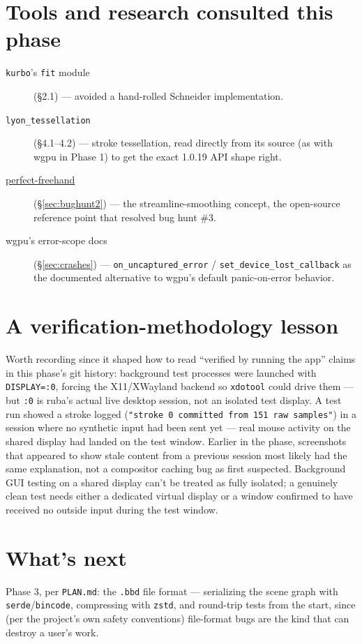 \documentclass[11pt]{article}
\begin{document}
\section{Tools and research consulted this phase}
\begin{description}
  \item[\texttt{kurbo}'s \texttt{fit} module] (\S2.1) — avoided a hand-rolled Schneider
    implementation.
  \item[\texttt{lyon\_tessellation}] (\S4.1--4.2) — stroke tessellation, read directly
    from its source (as with wgpu in Phase 1) to get the exact 1.0.19 API shape right.
  \item[\href{https://github.com/steveruizok/perfect-freehand}{perfect-freehand}]
    (\S\ref{sec:bughunt2}) — the streamline-smoothing concept, the open-source reference
    point that resolved bug hunt \#3.
  \item[wgpu's error-scope docs] (\S\ref{sec:crashes}) — \texttt{on\_uncaptured\_error} /
    \texttt{set\_device\_lost\_callback} as the documented alternative to wgpu's default
    panic-on-error behavior.
\end{description}

\section{A verification-methodology lesson}
Worth recording since it shaped how to read ``verified by running the app'' claims in this
phase's git history: background test processes were launched with
\texttt{DISPLAY=:0}, forcing the X11/XWayland backend so \texttt{xdotool} could drive
them — but \texttt{:0} is ruba's actual live desktop session, not an isolated test
display. A test run showed a stroke logged (\texttt{"stroke 0 committed from 151 raw
samples"}) in a session where no synthetic input had been sent yet — real mouse activity
on the shared display had landed on the test window. Earlier in the phase, screenshots
that appeared to show stale content from a previous session most likely had the same
explanation, not a compositor caching bug as first suspected. Background GUI testing on a
shared display can't be treated as fully isolated; a genuinely clean test needs either a
dedicated virtual display or a window confirmed to have received no outside input during
the test window.

\section{What's next}
Phase 3, per \texttt{PLAN.md}: the \texttt{.bbd} file format — serializing the scene graph
with \texttt{serde}/\texttt{bincode}, compressing with \texttt{zstd}, and round-trip tests
from the start, since (per the project's own safety conventions) file-format bugs are the
kind that can destroy a user's work.
\end{document}
